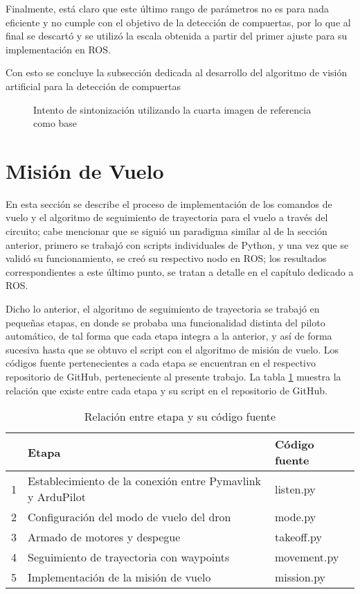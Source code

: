 Finalmente, está claro que este último rango de parámetros no es para nada eficiente y no cumple con el objetivo de la detección de compuertas, por lo que al final se descartó y se utilizó la escala obtenida a partir del primer ajuste para su implementación en ROS.

Con esto se concluye la subsección dedicada al desarrollo del algoritmo de visión artificial para la detección de compuertas

\begin{figure}[ht]
    \centering
    \hfill

    \caption{Intento de sintonización utilizando la cuarta imagen de referencia como base}
    \label{fig:cv_gatesth3}
\end{figure}

\newpage

\section{Misión de Vuelo}
En esta sección se describe el proceso de implementación de los comandos de vuelo y el algoritmo de seguimiento de trayectoria para el vuelo a través del circuito; cabe mencionar que se siguió un paradigma similar al de la sección anterior, primero se trabajó con scripts individuales de Python, y una vez que se validó su funcionamiento, se creó su respectivo nodo en ROS; los resultados correspondientes a este último punto, se tratan a detalle en el capítulo dedicado a ROS.

Dicho lo anterior, el algoritmo de seguimiento de trayectoria se trabajó en pequeñas etapas, en donde se probaba una funcionalidad distinta del piloto automático, de tal forma que cada etapa integra a la anterior, y así de forma sucesiva hasta que se obtuvo el script con el algoritmo de misión de vuelo. Los códigos fuente pertenecientes a cada etapa se encuentran en el respectivo repositorio de GitHub, perteneciente al presente trabajo. La tabla \ref{tab:pymavlink} muestra la relación que existe entre cada etapa y su script en el repositorio de GitHub.

\begin{table}[ht]
    \centering
    \begin{tabular}{lll}
        \hline
          & Etapa & Código fuente\\
        \hline
        1 & Establecimiento de la conexión entre Pymavlink y ArduPilot & listen.py\\
        2 & Configuración del modo de vuelo del dron & mode.py\\
        3 & Armado de motores y despegue & takeoff.py\\
        4 & Seguimiento de trayectoria con waypoints & movement.py\\
        5 & Implementación de la misión de vuelo & mission.py\\
        \hline
    \end{tabular}
    \caption{Relación entre etapa y su código fuente}
    \label{tab:pymavlink}
\end{table}

